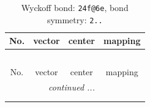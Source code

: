 \documentclass[fleqn,8pt]{jsarticle}
\begin{document}
\renewcommand{\arraystretch}{1.2}
\begin{longtable}{cccc}
\caption{Wyckoff bond: {\tt 24f@6e}, bond symmetry: {\tt 2..}}
 \\
 \hline \hline
No. & vector & center & mapping \\ \hline \endfirsthead

\multicolumn{3}{l}{\tablename\ \thetable{}} \\
 \hline \hline
No. & vector & center & mapping \\ \hline \endhead

 \hline \hline
\multicolumn{3}{r}{\footnotesize\it continued ...} \\ \endfoot

 \hline \hline
\multicolumn{3}{r}{} \\ \endlastfoot


\end{longtable}
\end{document}
